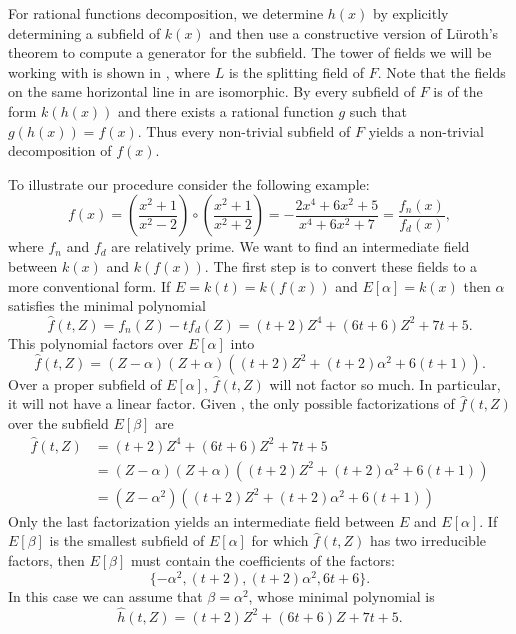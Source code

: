 For rational functions decomposition, we determine $h(x)$ by explicitly
determining a subfield of $k(x)$ and then use a constructive version of
L\"uroth's theorem to compute a generator for the subfield.  The tower of
fields we will be working with is shown in
, where $L$ is the splitting field of $F$.
Note that the fields on the same horizontal line in
 are isomorphic.  By
 every subfield of $F$ is of the form $k(h(x))$ and
there exists a rational function $g$ such that $g(h(x)) = f(x)$.  Thus
every non-trivial subfield of $F$ yields a non-trivial decomposition of 
$f(x)$.

To illustrate our procedure consider the following example:
\[
f(x) = \left(\frac{x^2+1}{x^2-2}\right) \circ
\left(\frac{x^2+1}{x^2+2}\right) = - \frac{2x^4 + 6 x^2 + 5}{x^4 + 6 x^2 +
7}
= \frac{f_n(x)}{f_d(x)},
\]
where $f_n$ and $f_d$ are relatively prime.  We want to find an
intermediate field between $k(x)$ and $k(f(x))$.  The first step is to
convert these fields to a more conventional form.  If $E = k(t) =
k(f(x))$ and $E[\alpha] = k(x)$ then $\alpha$ satisfies the minimal
polynomial
\[
\hat{f}(t, Z) = f_n(Z) - t f_d(Z) = (t + 2) Z^4 + (6t + 6) Z^2 + 7t + 5.
\]
This polynomial factors over $E[\alpha]$ into
\begin{equation}
\label{P:Alpha:Factorization:Eq}
\hat{f}(t, Z) = 
  (Z - \alpha) (Z + \alpha) ( (t+2)Z^2 + (t+2)\alpha^2 + 6(t+1)).
\end{equation}
Over a proper subfield of $E[\alpha]$, $\hat{f}(t, Z)$ will not factor so
much.  In particular, it will not have a linear factor.  Given
,  the only possible factorizations of
$\hat{f}(t, Z)$ over the subfield $E[\beta]$ are
\[
\begin{aligned}
\hat{f}(t, Z) & = (t + 2) Z^4 + (6t + 6) Z^2 + 7t + 5 \\
  & = (Z - \alpha) (Z + \alpha) ((t+2)Z^2 + (t+2)\alpha^2 + 6(t+1)) \\
  & = (Z - \alpha^2) ((t+2)Z^2 + (t+2)\alpha^2 + 6(t+1))
\end{aligned}
\]
Only the last factorization yields an intermediate field between
$E$ and $E[\alpha]$.  If $E[\beta]$ is the smallest subfield of
$E[\alpha]$ for which $\hat{f}(t, Z)$ has two irreducible factors,
then $E[\beta]$ must contain the coefficients of the factors:
\[
\{ -\alpha^2, (t+2), (t+2)\alpha^2, 6t+6\}.
\]
In this case we can assume that $\beta = \alpha^2$, whose minimal
polynomial is
\begin{equation}
\label{Beta:Eq}
\hat{h}(t, Z) = (t + 2) Z^2 + (6t + 6) Z + 7t + 5.
\end{equation}

